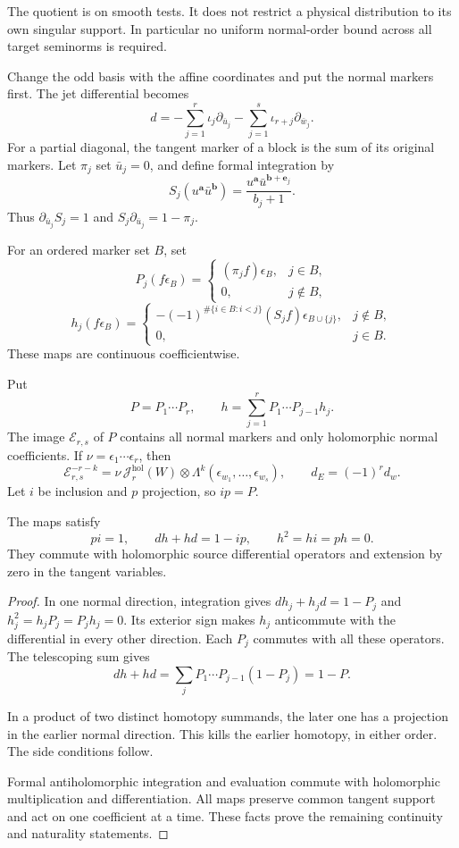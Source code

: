 The quotient is on smooth tests. It does not restrict
a physical distribution to its own singular support.
In particular no uniform normal-order bound across all
target seminorms is required.

Change the odd basis with the affine coordinates and put
the normal markers first. The jet differential becomes
\[
 d=-\sum_{j=1}^r\iota_j\partial_{\bar u_j}
       -\sum_{j=1}^s\iota_{r+j}\partial_{\bar w_j}.
\]
For a partial diagonal, the tangent marker of a block is
the sum of its original markers. Let $\pi_j$ set
$\bar u_j=0$, and define formal integration by
\[
 S_j(u^{\mathbf a}\bar u^{\mathbf b})
  =\frac{u^{\mathbf a}\bar u^{\mathbf b+\mathbf e_j}}{b_j+1}.
\]
Thus $\partial_{\bar u_j}S_j=1$ and
$S_j\partial_{\bar u_j}=1-\pi_j$.

For an ordered marker set $B$, set
\[
 P_j(f\epsilon_B)=
 \begin{cases}(\pi_jf)\epsilon_B,&j\in B,\\0,&j\notin B,
 \end{cases}
\]
\[
 h_j(f\epsilon_B)=
 \begin{cases}
 -(-1)^{\#\{i\in B:i<j\}}(S_jf)\epsilon_{B\cup\{j\}},&j\notin B,\\
 0,&j\in B.
 \end{cases}
\]
These maps are continuous coefficientwise.

Put
\[
 P=P_1\cdots P_r,
 \qquad h=\sum_{j=1}^rP_1\cdots P_{j-1}h_j.
\]
The image $\mathcal E_{r,s}$ of $P$ contains all normal
markers and only holomorphic normal coefficients. If
$\nu=\epsilon_1\cdots\epsilon_r$, then
\[
 \mathcal E_{r,s}^{-r-k}
 =\nu\,\mathcal J_r^{\mathrm{hol}}(W)
       \otimes\Lambda^k(\epsilon_{w_1},\ldots,\epsilon_{w_s}),
 \qquad d_E=(-1)^r d_w.
\]
Let $i$ be inclusion and $p$ projection, so $ip=P$.

\begin{proposition}\label{mht:prop:normal-source-contraction}
The maps satisfy
\[
 pi=1,\qquad dh+hd=1-ip,\qquad h^2=hi=ph=0.
\]
They commute with holomorphic source differential operators
and extension by zero in the tangent variables.
\end{proposition}
\begin{proof}
In one normal direction, integration gives
$dh_j+h_jd=1-P_j$ and $h_j^2=h_jP_j=P_jh_j=0$.
Its exterior sign makes $h_j$ anticommute with the
differential in every other direction. Each $P_j$ commutes
with all these operators. The telescoping sum gives
\[
 dh+hd=\sum_jP_1\cdots P_{j-1}(1-P_j)=1-P.
\]

In a product of two distinct homotopy summands, the later
one has a projection in the earlier normal direction.
This kills the earlier homotopy, in either order.
The side conditions follow.

Formal antiholomorphic integration and evaluation commute
with holomorphic multiplication and differentiation.
All maps preserve common tangent support and act on one
coefficient at a time. These facts prove the remaining
continuity and naturality statements.
\end{proof}

